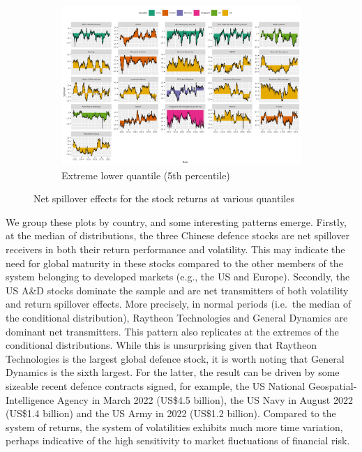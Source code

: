 \documentclass[
  letterpaper,
  DIV=11,
  numbers=noendperiod]{scrartcl}
\begin{document}
\begin{figure}
{\begin{figure}[H]
\end{figure}

\begin{figure}[H]

{\centering \includegraphics[width=6.75in,height=\textheight]{plots/fig-rtnnet5.png}

}

\caption{Extreme lower quantile (5th percentile)}

\end{figure}

}

\caption{\label{fig-netrtn}Net spillover effects for the stock returns
at various quantiles}

\end{figure}

We group these plots by country, and some interesting patterns emerge.
Firstly, at the median of distributions, the three Chinese defence
stocks are net spillover receivers in both their return performance and
volatility. This may indicate the need for global maturity in these
stocks compared to the other members of the system belonging to
developed markets (e.g., the US and Europe). Secondly, the US A\&D
stocks dominate the sample and are net transmitters of both volatility
and return spillover effects. More precisely, in normal periods
(i.e.~the median of the conditional distribution), Raytheon Technologies
and General Dynamics are dominant net transmitters. This pattern also
replicates at the extremes of the conditional distributions. While this
is unsurprising given that Raytheon Technologies is the largest global
defence stock, it is worth noting that General Dynamics is the sixth
largest. For the latter, the result can be driven by some sizeable
recent defence contracts signed, for example, the US National
Geospatial-Intelligence Agency in March 2022 (US\$4.5 billion), the US
Navy in August 2022 (US\$1.4 billion) and the US Army in 2022 (US\$1.2
billion). Compared to the system of returns, the system of volatilities
exhibits much more time variation, perhaps indicative of the high
sensitivity to market fluctuations of financial risk.
\end{document}
